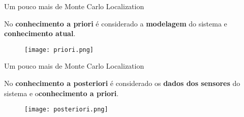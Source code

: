 
\begin{frame}[t]{Um pouco mais de Monte Carlo Localization}

    No \textbf{conhecimento a priori} é considerado  a \textbf{modelagem} do sistema e \textbf{conhecimento atual}. 
    \begin{figure}
        \vskip1.2cm
        \texttt{[image: priori.png]}%
        
    
    \end{figure}
\end{frame}


\begin{frame}[t]{Um pouco mais de Monte Carlo Localization}

    No \textbf{conhecimento a posteriori} é considerado  os \textbf{dados dos sensores} do sistema e  o\textbf{conhecimento a priori}. 
    \begin{figure}
        \vskip1.2cm
        \texttt{[image: posteriori.png]}%
        
    
    \end{figure}
\end{frame}


%   
%    
%   



%   
%    
%   



